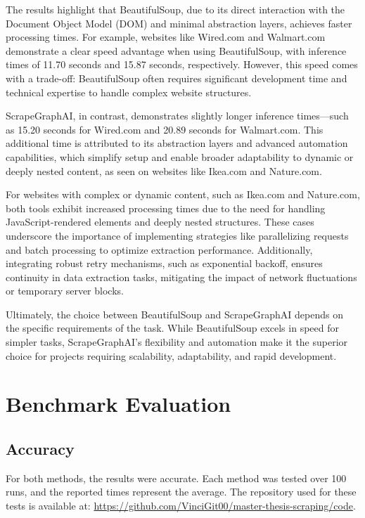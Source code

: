 The results highlight that BeautifulSoup, due to its direct interaction with the Document Object Model (DOM) and minimal abstraction layers, achieves faster processing times. For example, websites like Wired.com and Walmart.com demonstrate a clear speed advantage when using BeautifulSoup, with inference times of 11.70 seconds and 15.87 seconds, respectively. However, this speed comes with a trade-off: BeautifulSoup often requires significant development time and technical expertise to handle complex website structures.

ScrapeGraphAI, in contrast, demonstrates slightly longer inference times—such as 15.20 seconds for Wired.com and 20.89 seconds for Walmart.com. This additional time is attributed to its abstraction layers and advanced automation capabilities, which simplify setup and enable broader adaptability to dynamic or deeply nested content, as seen on websites like Ikea.com and Nature.com.

For websites with complex or dynamic content, such as Ikea.com and Nature.com, both tools exhibit increased processing times due to the need for handling JavaScript-rendered elements and deeply nested structures. These cases underscore the importance of implementing strategies like parallelizing requests and batch processing to optimize extraction performance. Additionally, integrating robust retry mechanisms, such as exponential backoff, ensures continuity in data extraction tasks, mitigating the impact of network fluctuations or temporary server blocks.

Ultimately, the choice between BeautifulSoup and ScrapeGraphAI depends on the specific requirements of the task. While BeautifulSoup excels in speed for simpler tasks, ScrapeGraphAI's flexibility and automation make it the superior choice for projects requiring scalability, adaptability, and rapid development.
\section{Benchmark Evaluation}

\subsection{Accuracy}

For both methods, the results were accurate. Each method was tested over 100 runs, and the reported times represent the average. The repository used for these tests is available at: \url{https://github.com/VinciGit00/master-thesis-scraping/code}.

